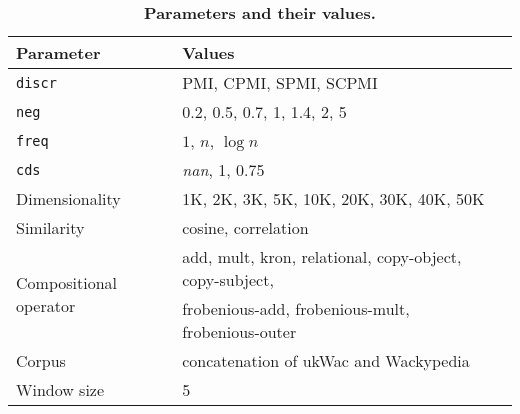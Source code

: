 \begin{table*}[th]
  \centering
  \begin{tabular}{llr}
    \toprule
    Parameter & Values \\
    \midrule
    \texttt{discr} & PMI, CPMI, SPMI, SCPMI \\
    \texttt{neg} & 0.2, 0.5, 0.7, 1, 1.4, 2, 5 \\
    \texttt{freq} & $1$, $n$, $\log n$ \\
    \texttt{cds} & \textit{nan}, 1, 0.75 \\
    Dimensionality & 1K, 2K, 3K, 5K, 10K, 20K, 30K, 40K, 50K \\
    Similarity & cosine, correlation \\
    \multirow{2}{*}{Compositional operator}
              & add, mult, kron, relational,
                copy-object, copy-subject, \\
              & frobenious-add, frobenious-mult,
                frobenious-outer
    \\
    Corpus & concatenation of ukWac and Wackypedia \\
    Window size & 5 \\
    \bottomrule
  \end{tabular}
  \caption{\textbf{Parameters and their values.}}
\label{tab:parameters}
\end{table*}

